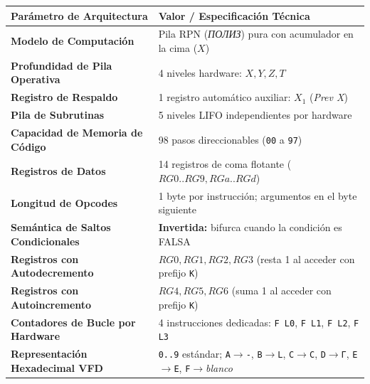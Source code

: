 \documentclass[11pt,a4paper]{article}
\begin{document}
\begin{center}
\renewcommand{\arraystretch}{1.2}
\setlength{\tabcolsep}{5pt}
\begin{tabular}{p{5.8cm}p{9.8cm}}
\toprule
\textbf{Parámetro de Arquitectura} & \textbf{Valor / Especificación Técnica} \\
\midrule
\textbf{Modelo de Computación} & Pila RPN (\textit{ПОЛИЗ}) pura con acumulador en la cima ($X$) \\
\textbf{Profundidad de Pila Operativa} & 4 niveles hardware: $X, Y, Z, T$ \\
\textbf{Registro de Respaldo} & 1 registro automático auxiliar: $X_1$ (\textit{Prev X}) \\
\textbf{Pila de Subrutinas} & 5 niveles LIFO independientes por hardware \\
\textbf{Capacidad de Memoria de Código} & 98 pasos direccionables (\texttt{00} a \texttt{97}) \\
\textbf{Registros de Datos} & 14 registros de coma flotante ($RG0..RG9, RGa..RGd$) \\
\textbf{Longitud de Opcodes} & 1 byte por instrucción; argumentos en el byte siguiente \\
\textbf{Semántica de Saltos Condicionales} & \textbf{Invertida:} bifurca cuando la condición es FALSA \\
\textbf{Registros con Autodecremento} & $RG0, RG1, RG2, RG3$ (resta 1 al acceder con prefijo \texttt{K}) \\
\textbf{Registros con Autoincremento} & $RG4, RG5, RG6$ (suma 1 al acceder con prefijo \texttt{K}) \\
\textbf{Contadores de Bucle por Hardware} & 4 instrucciones dedicadas: \texttt{F L0}, \texttt{F L1}, \texttt{F L2}, \texttt{F L3} \\
\textbf{Representación Hexadecimal VFD} & \texttt{0..9} estándar; \texttt{A}$\to$\texttt{-}, \texttt{B}$\to$\texttt{L}, \texttt{C}$\to$\texttt{C}, \texttt{D}$\to$\texttt{Г}, \texttt{E}$\to$\texttt{E}, \texttt{F}$\to$\textit{blanco} \\
\bottomrule
\end{tabular}
\end{center}
\end{document}
